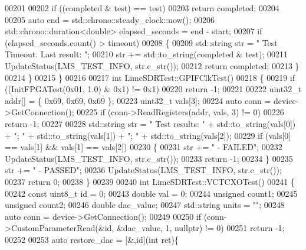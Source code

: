 \begin{DoxyCode}
{{{00201 
00202         \textcolor{keywordflow}{if} ((completed & test) == test)
00203             \textcolor{keywordflow}{return} completed;
00204 
00205         \textcolor{keyword}{auto} end = std::chrono::steady\_clock::now();
00206         std::chrono::duration<double> elapsed\_seconds = end - start;
00207         \textcolor{keywordflow}{if} (elapsed\_seconds.count() > timeout)
00208         \{
00209             std::string str = \textcolor{stringliteral}{"  Test Timeout. Last result: "};
00210             str += std::to\_string(completed & test);
00211             UpdateStatus(LMS_TEST_INFO, str.c\_str());
00212             \textcolor{keywordflow}{return} completed;
00213         \}
00214     \}
00215 \}
00216 
00217 \textcolor{keywordtype}{int} LimeSDRTest::GPIFClkTest()
00218 \{
00219     \textcolor{keywordflow}{if} ((InitFPGATest(0x01, 1.0) & 0x1) != 0x1)
00220         \textcolor{keywordflow}{return} -1;
00221 
00222     uint32\_t addr[] = \{ 0x69, 0x69, 0x69 \};
00223     uint32\_t vals[3];
00224     \textcolor{keyword}{auto} conn = device->GetConnection();
00225     \textcolor{keywordflow}{if} (conn->ReadRegisters(addr, vals, 3) != 0)
00226         \textcolor{keywordflow}{return} -1;
00227 
00228     std::string str = \textcolor{stringliteral}{"  Test results: "} + std::to\_string(vals[0]) + \textcolor{stringliteral}{"; "} + std::to\_string(vals[1]) + \textcolor{stringliteral}{"; "} 
      + std::to\_string(vals[2]);
00229     \textcolor{keywordflow}{if} (vals[0] == vals[1] && vals[1] == vals[2])
00230     \{
00231         str += \textcolor{stringliteral}{" - FAILED"};
00232         UpdateStatus(LMS_TEST_INFO, str.c\_str());
00233         \textcolor{keywordflow}{return} -1;
00234     \}
00235     str += \textcolor{stringliteral}{" - PASSED"};
00236     UpdateStatus(LMS_TEST_INFO, str.c\_str());
00237     \textcolor{keywordflow}{return} 0;
00238 \}
00239 
00240 \textcolor{keywordtype}{int} LimeSDRTest::VCTCXOTest()
00241 \{
00242     \textcolor{keyword}{const} uint8\_t \textcolor{keywordtype}{id} = 0;
00243     \textcolor{keywordtype}{double} val = 0;
00244     \textcolor{keywordtype}{unsigned} count1;
00245     \textcolor{keywordtype}{unsigned} count2;
00246     \textcolor{keywordtype}{double} dac\_value;
00247     std::string units = \textcolor{stringliteral}{""};
00248     \textcolor{keyword}{auto} conn = device->GetConnection();
00249 
00250     \textcolor{keywordflow}{if} (conn->CustomParameterRead(&\textcolor{keywordtype}{id}, &dac\_value, 1, \textcolor{keyword}{nullptr}) != 0)
00251         \textcolor{keywordflow}{return} -1;
00252 
00253     \textcolor{keyword}{auto} restore\_dac = [&,id](\textcolor{keywordtype}{int} ret)\{
}}}
\end{DoxyCode}
